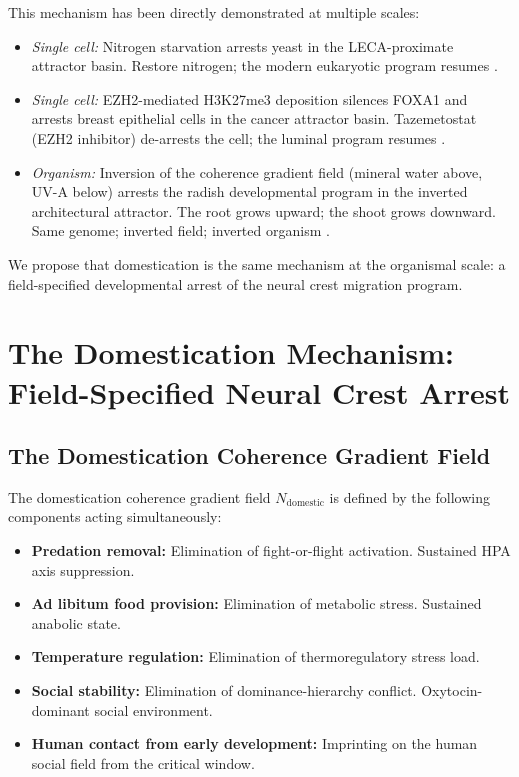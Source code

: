 \documentclass[11pt, a4paper]{article}
\begin{document}
This mechanism has been directly demonstrated at
multiple scales:
\begin{itemize}[itemsep=0.1em]
  \item \textit{Single cell:} Nitrogen starvation
    arrests yeast in the LECA-proximate attractor basin.
    Restore nitrogen; the modern eukaryotic program
    resumes \cite{leca2026}.
  \item \textit{Single cell:} EZH2-mediated H3K27me3
    deposition silences FOXA1 and arrests breast
    epithelial cells in the cancer attractor basin.
    Tazemetostat (EZH2 inhibitor) de-arrests the cell;
    the luminal program resumes \cite{foxa1ezh2_2026}.
  \item \textit{Organism:} Inversion of the coherence
    gradient field (mineral water above, UV-A below)
    arrests the radish developmental program in the
    inverted architectural attractor. The root grows
    upward; the shoot grows downward. Same genome;
    inverted field; inverted organism \cite{plantinv2026}.
\end{itemize}

We propose that domestication is the same mechanism
at the organismal scale: a field-specified developmental
arrest of the neural crest migration program.

\section{The Domestication Mechanism: Field-Specified
Neural Crest Arrest}
\label{sec:mechanism}

\subsection{The Domestication Coherence Gradient Field}

The domestication coherence gradient field
$N_{\text{domestic}}$ is defined by the following
components acting simultaneously:

\begin{itemize}[itemsep=0.15em]
  \item \textbf{Predation removal:} Elimination of
    fight-or-flight activation. Sustained HPA axis
    suppression.
  \item \textbf{Ad libitum food provision:} Elimination
    of metabolic stress. Sustained anabolic state.
  \item \textbf{Temperature regulation:} Elimination of
    thermoregulatory stress load.
  \item \textbf{Social stability:} Elimination of
    dominance-hierarchy conflict. Oxytocin-dominant
    social environment.
  \item \textbf{Human contact from early development:}
    Imprinting on the human social field from the
    critical window.
\end{itemize}
\end{document}
